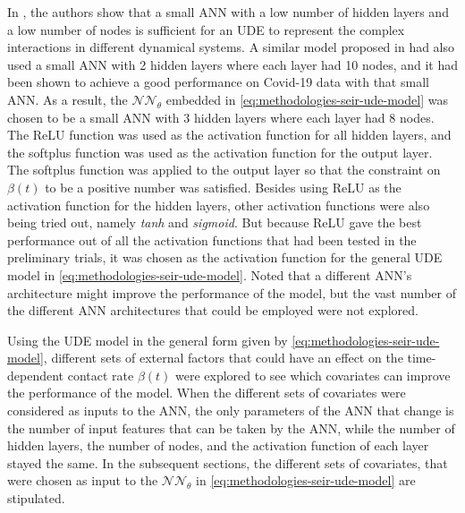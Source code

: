 In \cite{rackauckasUniversalDifferentialEquations2020}, the authors show that a small \gls{ANN} with a low number of hidden layers and a low number of nodes is sufficient for an \gls{UDE} to represent the complex interactions in different dynamical systems.
A similar model proposed in \cite{dandekarMachineLearningAidedGlobal2020a} had also used a small \gls{ANN} with 2 hidden layers where each layer had 10 nodes, and it had been shown to achieve a good performance on Covid-19 data with that small \gls{ANN}.
As a result, the $\mathcal{NN}_\theta$ embedded in \autoref{eq:methodologies-seir-ude-model} was chosen to be a small \gls{ANN} with 3 hidden layers where each layer had 8 nodes.
The \gls{ReLU} function was used as the activation function for all hidden layers, and the softplus function was used as the activation function for the output layer.
The softplus function was applied to the output layer so that the constraint on $\beta(t)$ to be a positive number was satisfied.
Besides using \gls{ReLU} as the activation function for the hidden layers, other activation functions were also being tried out, namely \textit{tanh} and \textit{sigmoid}.
But because \gls{ReLU} gave the best performance out of all the activation functions that had been tested in the preliminary trials, it was chosen as the activation function for the general \gls{UDE} model in \autoref{eq:methodologies-seir-ude-model}.
Noted that a different \gls{ANN}'s architecture might improve the performance of the model, but the vast number of the different \gls{ANN} architectures that could be employed were not explored.

Using the \gls{UDE} model in the general form given by \autoref{eq:methodologies-seir-ude-model}, different sets of external factors that could have an effect on the time-dependent contact rate $\beta (t)$ were explored to see which covariates can improve the performance of the model.
When the different sets of covariates were considered as inputs to the \gls{ANN}, the only parameters of the \gls{ANN} that change is the number of input features that can be taken by the \gls{ANN}, while the number of hidden layers, the number of nodes, and the activation function of each layer stayed the same.
In the subsequent sections, the different sets of covariates, that were chosen as input to the $\mathcal{NN}_\theta$ in \autoref{eq:methodologies-seir-ude-model} are stipulated.

